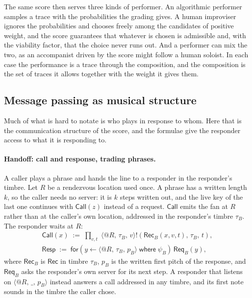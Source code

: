 \documentclass[11pt,a4paper]{article}
\makeatletter
\theoremstyle{plain}
\theoremstyle{definition}
\theoremstyle{remark}
\newcommand{\nm}[3]{\langle @#1,\,#2,\,#3\rangle}
\newcommand{\snd}[4]{#1!(#2,\,#3,\,#4)}
\newcommand{\rcvw}[4]{\mathsf{for}(#1 \leftarrow #2 \;\mathsf{where}\; #3)\,#4}
\newcommand{\Rec}{\mathsf{Rec}}
\newcommand{\Call}{\mathsf{Call}}
\newcommand{\Resp}{\mathsf{Resp}}
\newcommand{\Req}{\mathsf{Req}}
\newcommand{\wild}{\_}
\makeatother
\begin{document}
The same score then serves three kinds of performer. An algorithmic performer
samples a trace with the probabilities the grading gives. A human improviser
ignores the probabilities and chooses freely among the candidates of positive
weight, and the score guarantees that whatever is chosen is admissible and, with
the viability factor, that the choice never runs out. And a performer can mix
the two, as an accompanist driven by the score might follow a human soloist. In
each case the performance is a trace through the composition, and the
composition is the set of traces it allows together with the weight it gives
them.

\subsection{Message passing as musical structure}\label{ssec:exchange}

Much of what is hard to notate is who plays in response to whom. Here that is
the communication structure of the score, and the formulae give the responder
access to what it is responding to.

\paragraph{Handoff: call and response, trading phrases.} A caller plays a
phrase and hands the line to a responder in the responder's timbre. Let $R$ be a
rendezvous location used once. A phrase has a written length $k$, so the caller
needs no server: it is $k$ steps written out, and the live key of the last one
continues with $\Call(z)$ instead of a request. $\Call$ emits the fan at $R$
rather than at the caller's own location, addressed in the responder's timbre
$\tau_B$. The responder waits at $R$:
\begin{gather*}
\Call(x) \;:=\; \prod_{v,t}\;\snd{\nm{R}{\tau_B}{v}}{\Rec_B(x,v,t)}{\tau_B}{t},
\\
\Resp \;:=\; \rcvw{y}{\nm{R}{\tau_B}{p_B}}{\psi_B}{\Req_B(y)},
\end{gather*}
where $\Rec_B$ is $\Rec$ in timbre $\tau_B$, $p_B$ is the written first pitch
of the response, and $\Req_B$ asks the responder's own server for its next step.
A responder that listens on $\nm{R}{\wild}{p_B}$ instead answers a call addressed
in any timbre, and its first note sounds in the timbre the caller chose.
\end{document}
